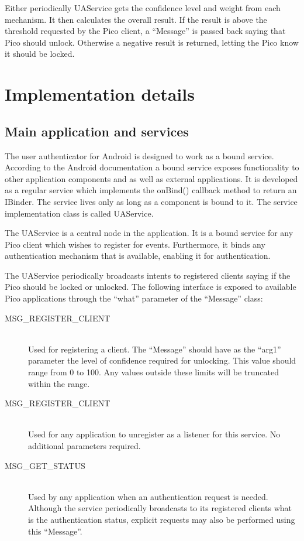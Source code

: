 Either periodically UAService gets the confidence level and weight from each mechanism. It then calculates the overall result. If the result is above the threshold requested by the Pico client, a ``Message'' is passed back saying that Pico should unlock. Otherwise a negative result is returned, letting the Pico know it should be locked. 

\section{Implementation details}

\subsection{Main application and services}
The user authenticator for Android is designed to work as a bound service. According to the Android documentation a bound service exposes functionality to other application components and as well as external applications. It is developed as a regular service which implements the onBind() callback method to return an IBinder. The service lives only as long as a component is bound to it. The service implementation class is called UAService.

The UAService is a central node in the application. It is a bound service for any Pico client which wishes to register for events. Furthermore, it binds any authentication mechanism that is available, enabling it for authentication. 

The UAService periodically broadcasts intents to registered clients saying if the Pico should be locked or unlocked. The following interface is exposed to available Pico applications through the ``what'' parameter of the ``Message'' class:
\begin{description}
  \item[MSG\_REGISTER\_CLIENT] \hfill \\
  Used for registering a client. The ``Message'' should have as the ``arg1'' parameter the level of confidence required for unlocking. This value should range from 0 to 100. Any values outside these limits will be truncated within the range.
  
  \item[MSG\_REGISTER\_CLIENT] \hfill \\
  Used for any application to unregister as a listener for this service. No additional parameters required.
  
  \item[MSG\_GET\_STATUS] \hfill \\
  Used by any application when an authentication request is needed. Although the service periodically broadcasts to its registered clients what is the authentication status, explicit requests may also be performed using this ``Message''.
\end{description}


